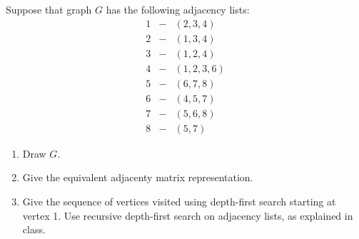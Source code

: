 Suppose that graph $G$  has the following adjacency lists:
%
\begin{eqnarray*}
 1 & - & (2,3,4) \\
  2 & - & (1,3,4) \\
  3 & - & (1,2,4) \\
  4 & - & (1,2,3,6) \\
  5 & - & (6,7,8) \\
  6 & - & (4,5,7) \\
  7 & - & (5,6,8) \\
  8 & - & (5,7)
\end{eqnarray*}
%
\begin{enumerate}

\item  Draw $G$.

\item  Give the equivalent adjacenty matrix representation.

\item  Give the sequence of vertices visited using depth-first search starting at vertex 1. Use recursive depth-first search on adjacency lists, as explained in class.

\end{enumerate}

